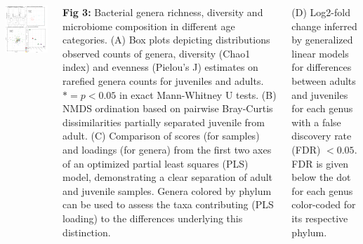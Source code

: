 \documentclass[30pt, a0paper, portrait, margin=0mm, innermargin=15mm,
               blockverticalspace=15mm, colspace=15mm, subcolspace=8mm]{tikzposter}
\begin{document}
\begin{columns}


 {

  \begin{minipage}{0.5\linewidth}                  
  \includegraphics[scale=0.6]{Figure3_man.png} 
  \end{minipage}
  \hfill
  \begin{minipage}{0.5\linewidth}
  
    \textbf{Fig 3:} Bacterial genera richness, diversity and
    microbiome composition in different age categories. (A) Box plots
    depicting distributions observed counts of genera, diversity
    (Chao1 index) and evenness (Pielou's J) estimates on rarefied
    genera counts for juveniles and adults. $* = p < 0.05$ in exact
    Mann-Whitney U tests. (B) NMDS ordination based on pairwise
    Bray-Curtis dissimilarities partially separated juvenile from
    adult. (C) Comparison of scores (for samples) and loadings (for
    genera) from the first two axes of an optimized partial least
    squares (PLS) model, demonstrating a clear separation of adult and
    juvenile samples. Genera colored by phylum can be used to assess
    the taxa contributing (PLS loading) to the differences underlying
    this distinction.
  \end{minipage}
  (D) Log2-fold change inferred by generalized linear models for
  differences between adults and juveniles for each genus with a false
  discovery rate (FDR) $< 0.05$.  FDR is given below the dot for each
  genus color-coded for its respective phylum.

}
\end{columns}
\end{document}

